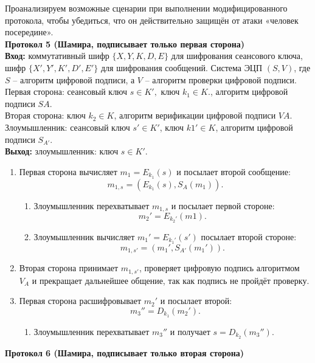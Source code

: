 	Проанализируем возможные сценарии при выполнении модифицированного протокола, чтобы убедиться, что он действительно защищён от атаки «человек посередине».\\
\textbf{Протокол 5 (Шамира, подписывает только первая сторона)}\\
\hspace*{10mm}\textbf{Вход:} коммутативный шифр $\{X, Y, K, D, E\}$ для шифрования сеансового ключа, шифр $\{X', Y', K', D', E'\}$ для шифрования сообщений. Система ЭЦП $(S,V)$, где $S$ – алгоритм цифровой подписи, а $V$ – алгоритм проверки цифровой подписи.\\
Первая сторона: сеансовый ключ $s\in K',$ ключ $k_{1}\in K.$, алгоритм цифровой подписи $SA.$\\
Вторая сторона: ключ $k_{2}\in K$, алгоритм верификации цифровой подписи $VA.$\\
Злоумышленник: сеансовый ключ $s' \in K'$,  ключ $k1'\in K$, алгоритм цифровой подписи $S_{A'}$.\\
\hspace*{10mm}\textbf{Выход:} злоумышленник: ключ $s \in K'.$
\begin{enumerate}
	\item Первая сторона вычисляет $m_{1} = E_{k_{1}}(s)$ и посылает второй сообщение:
	$$m_{1,s} = (E_{k_{1}}(s), S_{A}(m_{1})).$$
	\begin{enumerate}
		\item Злоумышленник перехватывает $m_{1,s}$ и посылает первой стороне: 
		$$m_{2}'= E_{k_{2}'}(m1).$$
		\item Злоумышленник вычисляет $m_{1}' = E_{k_{1}'}(s')$ посылает второй стороне:
		$$m_{1,s'} = (m_{1}', S_{A'}(m_{1}')).$$
	\end{enumerate}
	\item Вторая сторона принимает $m_{1,s'}$, проверяет цифровую подпись алгоритмом $V_{A}$ и прекращает дальнейшее общение, так как подпись не пройдёт проверку.
	\item Первая сторона расшифровывает $m_{2}'$ и посылает второй:
	$$m_{3}'' = D_{k_{1}}(m_{2}').$$
	\begin{enumerate}
		\item Злоумышленник перехватывает $m_{3}''$ и получает $s = D_{k_{2}}(m_{3}'')$.
	\end{enumerate}
\end{enumerate}
\textbf{Протокол 6 (Шамира, подписывает только вторая сторона)}\\
